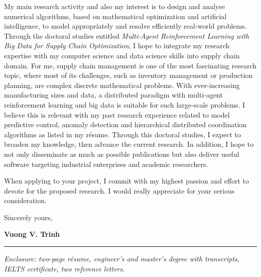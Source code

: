 \documentclass[a4paper,11pt]{article}
\begin{document}
{\begin{minipage}[t]{\textwidth+\marginparwidth+\marginparsep}
My main research activity and also my interest is to design and analyse numerical algorithms, based on mathematical optimization and artificial intelligence, to model appropriately and resolve efficiently real-world problems. Through the doctoral studies entitled \emph{Multi-Agent Reinforcement Learning with Big Data for Supply Chain Optimization}, I hope to integrate my research expertise with my computer science and data science skills into supply chain domain. For me, supply chain management is one of the most fascinating research topic, where most of its challenges, such as inventory management or production planning, are complex discrete mathematical problems. With ever-increasing manufacturing sizes and data, a distributed paradigm with multi-agent reinforcement learning and big data is suitable for such large-scale problems. I believe this is relevant with my past research experience related to model predictive control, anomaly detection and hierarchical distributed coordination algorithms as listed in my r\'{e}sume. Through this doctoral studies, I expect to broaden my knowledge, then advance the current research. In addition, I hope to not only disseminate as much as possible publications but also deliver useful software targeting industrial enterprises and academic researchers.

\vspace{0.3cm}

When applying to your project, I commit with my highest passion and effort to devote for the proposed research. I would really appreciate for your serious consideration. 

\vspace{0.3cm}

Sincerely yours,

\vspace{0.3cm}

\textbf{Vuong V. Trinh}

\vspace{1cm}

\rule{\columnwidth}{1pt}

\emph{Enclosure: two-page r\'esume, engineer's and master's degree with transcripts, IELTS certificate, two reference letters.}

\end{minipage}}
\end{document}
